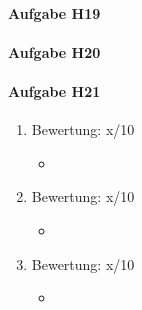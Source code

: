 \documentclass[11pt]{article}
\begin{document}

\paragraph{Aufgabe H19}


\paragraph{Aufgabe H20}


\paragraph{Aufgabe H21}
\begin{enumerate}[label=\alph*)]
\item Bewertung: x/10
\begin{itemize}
\item 
\end{itemize}

\item Bewertung: x/10
\begin{itemize}
\item
\end{itemize}

\item Bewertung: x/10
\begin{itemize}
\item
\end{itemize}
\end{enumerate}
\end{document}

